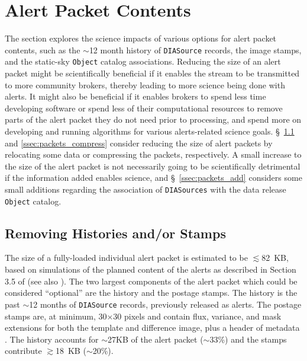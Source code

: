 \documentclass[DM,lsstdraft,authoryear,toc]{lsstdoc}
\begin{document}



\clearpage
\section{Alert Packet Contents} \label{sec:packets}

The section explores the science impacts of various options for alert packet contents, such as the $\sim$12 month history of {\tt DIASource} records, the image stamps, and the static-sky {\tt Object} catalog associations.
Reducing the size of an alert packet might be scientifically beneficial if it enables the stream to be transmitted to more community brokers, thereby leading to more science being done with alerts.
It might also be beneficial if it enables brokers to spend less time developing software or spend less of their computational resources to remove parts of the alert packet they do not need prior to processing, and spend more on developing and running algorithms for various alerts-related science goals.
\S~\ref{ssec:packets_remove} and \ref{ssec:packets_compress} consider reducing the size of alert packets by relocating some data or compressing the packets, respectively. 
A small increase to the size of the alert packet is not necessarily going to be scientifically detrimental if the information added enables science, and \S~\ref{ssec:packets_add} considers some small additions regarding the association of {\tt DIASources} with the data release {\tt Object} catalog.

\subsection{Removing Histories and/or Stamps}\label{ssec:packets_remove}

The size of a fully-loaded individual alert packet is estimated to be $\lesssim$82~KB, based on simulations of the planned content of the alerts as described in Section 3.5 of  (see also ). The two largest components of the alert packet which could be considered ``optional'' are the history and the postage stamps. The history is the past $\sim$12 months of {\tt DIASource} records, previously released as alerts. The postage stamps are, at minimum, 30$\times$30 pixels and contain flux, variance, and mask extensions for both the template and difference image, plus a header of metadata . The history accounts for $\sim$27KB of the alert packet ($\sim$33\%) and the stamps contribute $\gtrsim$18~KB ($\sim$20\%). 
\end{document}
